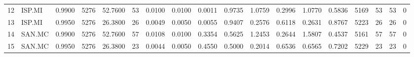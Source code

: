 \begin{table}
\begin{tabular}{llrrrrrrrrrrrrrrrr}
12 & ISP.MI & 0.9900 & 5276 & 52.7600 & 53 & 0.0100 & 0.0100 & 0.0011 & 0.9735 & 1.0759 & 0.2996 & 1.0770 & 0.5836 & 5169 & 53 & 53 & 0 \\
13 & ISP.MI & 0.9950 & 5276 & 26.3800 & 26 & 0.0049 & 0.0050 & 0.0055 & 0.9407 & 0.2576 & 0.6118 & 0.2631 & 0.8767 & 5223 & 26 & 26 & 0 \\
14 & SAN.MC & 0.9900 & 5276 & 52.7600 & 57 & 0.0108 & 0.0100 & 0.3354 & 0.5625 & 1.2453 & 0.2644 & 1.5807 & 0.4537 & 5161 & 57 & 57 & 0 \\
15 & SAN.MC & 0.9950 & 5276 & 26.3800 & 23 & 0.0044 & 0.0050 & 0.4550 & 0.5000 & 0.2014 & 0.6536 & 0.6565 & 0.7202 & 5229 & 23 & 23 & 0 \\
\bottomrule
\end{tabular}
\end{table}
